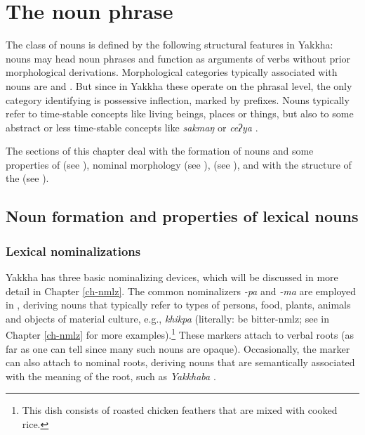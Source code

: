 ﻿\chapter{The noun phrase}\label{ch-noun}

The class of nouns is defined by the following structural features in Yakkha: nouns may head noun phrases and function as arguments of verbs without prior morphological derivations. Morphological categories typically associated with nouns are  and . But since in Yakkha these operate on the phrasal level, the only category identifying  is possessive inflection, marked by prefixes. Nouns typically refer to time-stable concepts like living beings, places or things, but also to some abstract or less time-stable concepts like \emph{sakmaŋ}  or \emph{ceʔya} .

The sections of this chapter deal with the formation of nouns and some properties of  (see ), nominal morphology (see ),   (see ), and with the structure of the  (see ). 

\section{Noun formation and properties of lexical nouns}\label{lex-noun}

\subsection{Lexical nominalizations}\label{lex-noun-1}

Yakkha has three basic nominalizing devices, which will be discussed in more detail in Chapter \ref{ch-nmlz}. The common  nominalizers \emph{-pa} and \emph{-ma} are employed in , deriving nouns that typically refer to types of persons, food, plants, animals and objects of material culture, e.g.,  \emph{khikpa}  (literally: be bitter-{\sc nmlz}; see  in Chapter \ref{ch-nmlz} for  more examples).\footnote{This dish consists of  roasted chicken feathers that are mixed with cooked rice.} These markers attach to verbal roots (as far as one can tell since many such nouns are opaque).  Occasionally, the marker can also attach to nominal roots, deriving nouns that are semantically associated with the meaning of the root, such as  \emph{Yakkhaba} . 

